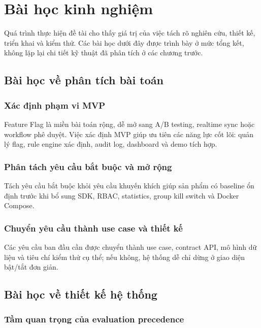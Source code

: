 \section{Bài học kinh nghiệm}

Quá trình thực hiện đề tài cho thấy giá trị của việc tách rõ nghiên cứu, thiết kế, triển khai và kiểm thử. Các bài học dưới đây được trình bày ở mức tổng kết, không lặp lại chi tiết kỹ thuật đã phân tích ở các chương trước.

\subsection{Bài học về phân tích bài toán}

\subsubsection{Xác định phạm vi MVP}

Feature Flag là miền bài toán rộng, dễ mở sang A/B testing, realtime sync hoặc workflow phê duyệt. Việc xác định MVP giúp ưu tiên các năng lực cốt lõi: quản lý flag, rule engine xác định, audit log, dashboard và demo tích hợp.

\subsubsection{Phân tách yêu cầu bắt buộc và mở rộng}

Tách yêu cầu bắt buộc khỏi yêu cầu khuyến khích giúp sản phẩm có baseline ổn định trước khi bổ sung SDK, RBAC, statistics, group kill switch và Docker Compose.

\subsubsection{Chuyển yêu cầu thành use case và thiết kế}

Các yêu cầu ban đầu cần được chuyển thành use case, contract API, mô hình dữ liệu và tiêu chí kiểm thử cụ thể; nếu không, hệ thống dễ chỉ dừng ở giao diện bật/tắt đơn giản.

\subsection{Bài học về thiết kế hệ thống}

\subsubsection{Tầm quan trọng của evaluation precedence}

